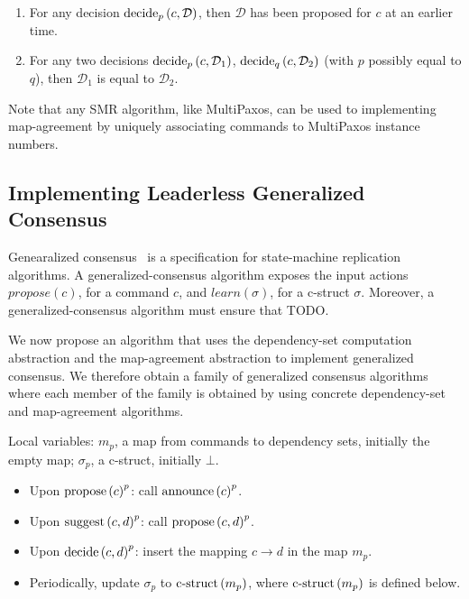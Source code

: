 \begin{enumerate}
    \item For any decision $\operatorname{decide}_p\left( c, \mathcal{D} \right)$, then $\mathcal{D}$ has been proposed for $c$ at an earlier time.
    \item For any two decisions $\operatorname{decide}_p\left( c, \mathcal{D}_1 \right)$, $\operatorname{decide}_q\left( c, \mathcal{D}_2 \right)$ (with $p$ possibly equal to $q$), then $\mathcal{D}_1$ is equal to $\mathcal{D}_2$.


\end{enumerate}

Note that any SMR algorithm, like MultiPaxos, can be used to implementing map-agreement by uniquely associating commands to MultiPaxos instance numbers.




\subsection{Implementing Leaderless Generalized Consensus}

Genearalized consensus~\cite{Lamport05GeneralizeConsensus} is a specification for state-machine replication algorithms. 
A generalized-consensus algorithm exposes the input actions $propose\left( c \right)$, for a command $c$, and $learn\left( \sigma \right)$, for a c-struct $\sigma$.
Moreover, a generalized-consensus algorithm must ensure that TODO.

We now propose an algorithm that uses the dependency-set computation abstraction and the map-agreement abstraction to implement generalized consensus. We therefore obtain a family of generalized consensus algorithms where each member of the family is obtained by using concrete dependency-set and map-agreement algorithms.


Local variables: $m_p$, a map from commands to dependency sets, initially the empty map; $\sigma_p$, a c-struct, initially $\bot$.
\begin{itemize}[noitemsep,nolistsep]
    \item Upon ${\operatorname{propose}\left( c \right)}^p$: call ${\operatorname{announce}\left( c \right)}^p$.
    \item Upon ${\operatorname{suggest}\left( c,d \right)}^p$: call ${\operatorname{propose}\left( c,d \right)}^p$.
    \item Upon ${\operatorname{decide}\left( c,d \right)}^p$: insert the mapping $c \rightarrow d$ in the map $m_p$.
    \item Periodically, update $\sigma_p$ to $\operatorname{c-struct}\left( m_p \right)$, where $\operatorname{c-struct}\left( m_p \right)$ is defined below.
\end{itemize}

